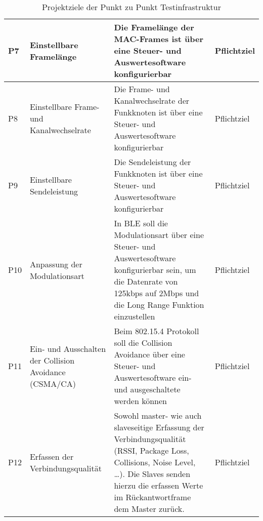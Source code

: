 \begin{table}[H]
\begin{tabular}{ | C{0.7cm} | p{2.8cm} | p{8.2cm} | C{2.5cm} |}
		P7 & Einstellbare Framelänge & Die Framelänge der MAC-Frames ist über eine Steuer- und Auswertesoftware konfigurierbar & Pflichtziel\\ \hline
		
		P8 & Einstellbare Frame- und Kanalwechselrate& Die Frame- und Kanalwechselrate der Funkknoten ist über eine Steuer- und Auswertesoftware konfigurierbar & Pflichtziel\\ \hline
		
		P9 & Einstellbare Sendeleistung & Die Sendeleistung der Funkknoten ist über eine Steuer- und Auswertesoftware konfigurierbar & Pflichtziel\\ \hline
		
		P10 & Anpassung der Modulationsart& In BLE soll die Modulationsart über eine Steuer- und Auswertesoftware konfigurierbar sein, um die Datenrate von 125kbps auf 2Mbps und die Long Range Funktion einzustellen & Pflichtziel\\ \hline
		
		P11 & Ein- und Ausschalten der Collision Avoidance (CSMA/CA)& Beim 802.15.4 Protokoll soll die Collision Avoidance über eine Steuer- und Auswertesoftware ein- und ausgeschaltete werden können& Pflichtziel\\ \hline
		
		P12 & Erfassen der Verbindungsqualität & Sowohl master- wie auch slaveseitige Erfassung der Verbindungsqualität (RSSI, Package Loss, Collisions, Noise Level, …). Die Slaves senden hierzu die erfassen Werte im Rückantwortframe dem Master zurück. & Pflichtziel\\ \hline
		
	\end{tabular}\\
	\caption{Projektziele der Punkt zu Punkt Testinfrastruktur}
	\label{tab:ProjektzielederPunktzuPunktTestinfrastruktur}
\end{table}


